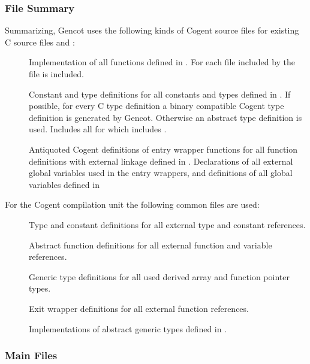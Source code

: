 \subsubsection{File Summary}

Summarizing, Gencot uses the following kinds of Cogent source files for existing C source files  and :
\begin{description}
\item[] Implementation of all functions defined in . For each file  included by
   the file  is included.
\item[] Constant and type definitions for all constants and types defined in . 
  If possible, for every C type definition a binary compatible Cogent type 
  definition is generated by Gencot. Otherwise an abstract type definition is used. Includes
  all  for which  includes .
\item[] Antiquoted Cogent definitions of entry wrapper functions for all function definitions with external linkage
  defined in . Declarations of all external global variables used in the entry wrappers, and definitions
  of all global variables defined in 
\end{description}

For the Cogent compilation unit the following common files are used:
\begin{description}
\item[] Type and constant definitions for all external type and constant references.
\item[] Abstract function definitions for all external function and variable references.
\item[] Generic type definitions for all used derived array and function pointer types.
\item[] Exit wrapper definitions for all external function references.
\item[] Implementations of abstract generic types defined in .
\end{description}

\subsubsection{Main Files}

